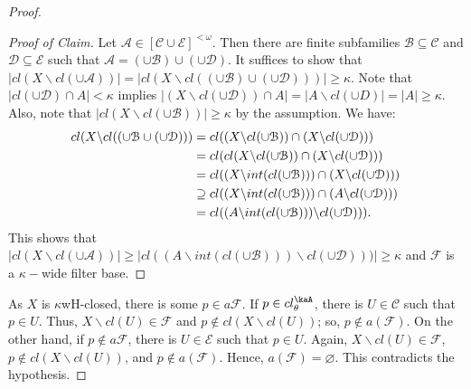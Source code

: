 \documentclass[11pt]{amsart}
\theoremstyle{definition}
\theoremstyle{remark}
\numberwithin{equation}{section}
\begin{document}
\begin{proof}
\begin{proof}[Proof of Claim] Let ${\ensuremath{\mathcal{A}}} \in  [{\ensuremath{\mathcal{{C}}}}\cup {\ensuremath{\mathcal{{E}}}}]^{<\omega}$.  Then there are  finite subfamilies ${\ensuremath{\mathcal{{B}}}}\subseteq {\ensuremath{\mathcal{{C}}}}$ and  ${\ensuremath{\mathcal{{D}}}} \subseteq {\ensuremath{\mathcal{{E}}}}$ such that ${\ensuremath{\mathcal{A}}} = (\cup{\ensuremath{\mathcal{{B}}}}) \cup (\cup{\ensuremath{\mathcal{{D}}}})$.  It suffices to show that $|cl(X\backslash cl(\cup {\ensuremath{\mathcal{A}}}))| = |cl(X\backslash cl( (\cup{\ensuremath{\mathcal{{B}}}}) \cup (\cup{\ensuremath{\mathcal{{D}}}})))| \geq \kappa$.  Note that $|cl(\cup{\ensuremath{\mathcal{{D}}}})\cap A| < \kappa$ implies $|(X\backslash cl(\cup{\ensuremath{\mathcal{{D}}}}) )\cap A| = |A\backslash cl(\cup D)| = |A| \geq \kappa$. Also, note that $|cl(X\backslash cl(\cup{\ensuremath{\mathcal{{B}}}}))| \geq \kappa$ by the assumption.  We have:  
\begin{align}
cl(X\backslash cl( (\cup{\ensuremath{\mathcal{{B}}}} \cup (\cup{\ensuremath{\mathcal{{D}}}})))&= cl((X\backslash cl( \cup{\ensuremath{\mathcal{{B}}}})) \cap (X\backslash cl( \cup{\ensuremath{\mathcal{{D}}}})))\notag\\
&= cl(cl(X\backslash cl( \cup{\ensuremath{\mathcal{{B}}}})) \cap (X\backslash cl( \cup{\ensuremath{\mathcal{{D}}}})))\notag\\
&= cl((X\backslash int(cl( \cup{\ensuremath{\mathcal{{B}}}}))) \cap (X\backslash cl( \cup{\ensuremath{\mathcal{{D}}}})))\notag\\
&\supseteq cl((X\backslash int(cl( \cup{\ensuremath{\mathcal{{B}}}}))) \cap (A\backslash cl( \cup{\ensuremath{\mathcal{{D}}}}))) \notag\\
&= cl((A\backslash int(cl( \cup{\ensuremath{\mathcal{{B}}}}))) \backslash cl( \cup{\ensuremath{\mathcal{{D}}}}))). \notag
\end{align}
\noindent This shows that $|cl(X\backslash cl(\cup {\ensuremath{\mathcal{A}}}))| \geq |cl((A\backslash int(cl( \cup{\ensuremath{\mathcal{{B}}}}))) \backslash cl( \cup{\ensuremath{\mathcal{{D}}}})))| \geq \kappa$ and   ${\ensuremath{\mathcal{{F}}}}$ is a  $\kappa-$wide filter base.  
\end{proof}
As $X$ is $\kappa$wH-closed, there is some  $p \in a{\ensuremath{\mathcal{{F}}}}$.  If $p \in cl_{\theta }^\kaA $, there is $U \in {\ensuremath{\mathcal{{C}}}}$ such that $p \in U$.  Thus, $X\backslash cl(U) \in{\ensuremath{\mathcal{{F}}}}$ and $p \not \in cl(X\backslash cl(U))$; so, $p \not\in a({\ensuremath{\mathcal{{F}}}})$.  On the other hand, if $p \not\in a{\ensuremath{\mathcal{{F}}}}$, there is $U \in{\ensuremath{\mathcal{{E}}}}$ such that $p \in U$.  Again, $X\backslash cl(U) \in {\ensuremath{\mathcal{{F}}}}$, $p \not \in cl(X\backslash cl(U))$, and $p \not\in a({\ensuremath{\mathcal{{F}}}})$.  Hence, $a({\ensuremath{\mathcal{{F}}}}) = \varnothing$.  This contradicts  the hypothesis.


\end{proof}
\end{document}
